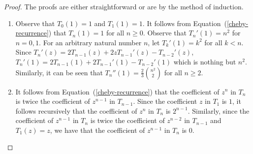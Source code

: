 \documentclass[12pt,a4paper]{article}
\theoremstyle{plain}
\numberwithin{equation}{section}
\begin{document}
\begin{proof} The proofs are either straightforward or are by the method of induction.
	
	\begin{enumerate}[label=(\roman{*})]
		
		\item	
		Observe that $T_0(1)=1$ and  $T_1(1)=1$. It follows from Equation~(\ref{cheby-recurrence}) that $T_n(1)=1$ for all $n \geq 0$.		
	 Observe that $T_n'(1)=n^2$  for $n=0, 1$. For an arbitrary natural number $n$, let $T_{k}'(1)=k^2$ for all $k<n$. Since $T_{n}'(z)= 2 T_{n-1}(z)+2z T_{n-1} '(z)-T_{n-2}'(z)$,  $T_{n}'(1)=2T_{n-1}(1)+2T_{n-1}'(1)-T_{n-2}'(1)$  which is nothing but $n^2$. Similarly, it can be seen that $T_n''(1)=\frac{2}{3}\binom{n^2}{2}$ 
	 for all $n \geq 2$.
		
	
       
\item 
It follows from Equation~(\ref{cheby-recurrence}) that the coefficient of $z^n$ in \(T_n\) is  twice the coefficient of \(z^{n-1}\)  in \(T_{n-1}\).  Since the coefficient $z$ in $ T_1 $  is $1$, it follows recursively that the coefficient of $z^n$ in $T_n$ is $2^{n-1}$. Similarly, since the coefficient  of $z^{n-1}$ in \(T_n\) is  twice the coefficient of \(z^{n-2}\)  in \(T_{n-1}\) and $T_1 (z)=z$, we have that 
the coefficient  of $z^{n-1}$ in \(T_n\) is $0$.\end{enumerate}
\end{proof}
\end{document}

